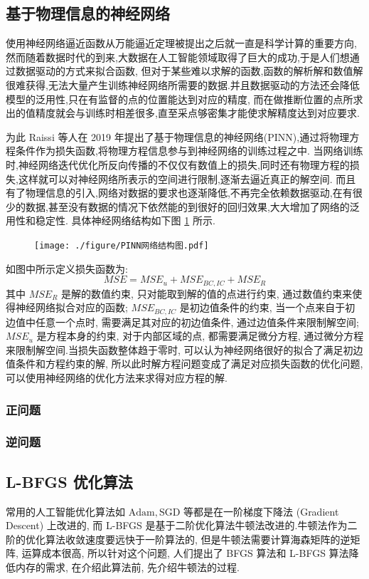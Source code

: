 \documentclass{Sichuan Normal University}
\begin{document}
\subsection{基于物理信息的神经网络}
使用神经网络逼近函数从万能逼近定理被提出之后就一直是科学计算的重要方向,然而随着数据时代的到来,大数据在人工智能领域取得了巨大的成功,于是人们想通过数据驱动的方式来拟合函数,
但对于某些难以求解的函数,函数的解析解和数值解很难获得,无法大量产生训练神经网络所需要的数据.并且数据驱动的方法还会降低模型的泛用性,只在有监督的点的位置能达到对应的精度,
而在做推断位置的点所求出的值精度就会与训练时相差很多,直至采点够密集才能使求解精度达到对应要求.

为此 Raissi 等人在 2019 年提出了基于物理信息的神经网络(PINN)\cite{raissiPhysicsinformedNeuralNetworks2019},通过将物理方程条件作为损失函数,将物理方程信息参与到神经网络的训练过程之中.
当网络训练时,神经网络迭代优化所反向传播的不仅仅有数值上的损失,同时还有物理方程的损失,这样就可以对神经网络所表示的空间进行限制,逐渐去逼近真正的解空间.
而且有了物理信息的引入,网络对数据的要求也逐渐降低,不再完全依赖数据驱动,在有很少的数据,甚至没有数据的情况下依然能的到很好的回归效果,大大增加了网络的泛用性和稳定性.
具体神经网络结构如下图 \ref{fig:PINN Network Structure} 所示.
\begin{figure}[H]
    \centering
    \texttt{[image: ./figure/PINN网络结构图.pdf]}
    \label{fig:PINN Network Structure}
    \end{figure}
如图中所示定义损失函数为:
\begin{equation}
    M S E=M S E_u+M S E_{B C, I C}+M S E_R
    \label{eq:损失函数}  
\end{equation}其中 $M S E_R$ 是解的数值约束, 只对能取到解的值的点进行约束, 通过数值约束来使得神经网络拟合对应的函数; $M S E_{B C, I C}$ 是初边值条件的约束, 当一个点来自于初边值中任意一个点时, 需要满足其对应的初边值条件, 通过边值条件来限制解空间; 
$M S E_u$ 是方程本身的约束, 对于内部区域的点, 都需要满足微分方程, 通过微分方程来限制解空间.当损失函数整体趋于零时, 可以认为神经网络很好的拟合了满足初边值条件和方程约束的解, 所以此时解方程问题变成了满足对应损失函数的优化问题, 可以使用神经网络的优化方法来求得对应方程的解.
\subsubsection{正问题}
\subsubsection{逆问题}
\subsection{L-BFGS 优化算法}
常用的人工智能优化算法如 $\mathrm{Adam}, \mathrm{SGD}$ 等都是在一阶梯度下降法 (Gradient Descent) 上改进的, 而 L-BFGS 是基于二阶优化算法牛顿法改进的.牛顿法作为二阶的优化算法收敛速度要远快于一阶算法的, 
但是牛顿法需要计算海森矩阵的逆矩阵, 运算成本很高, 所以针对这个问题, 人们提出了 BFGS 算法和 L-BFGS 算法降低内存的需求, 在介绍此算法前, 先介绍牛顿法的过程.
\end{document}
